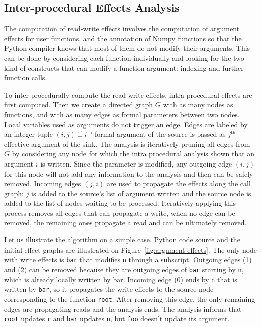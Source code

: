 \documentclass[10pt, preprint]{sigplanconf}
\begin{document}
\subsection{Inter-procedural Effects Analysis}
\label{sec:effects}

The computation of read-write effects involves the computation of argument
effects for user functions, and the annotation of Numpy functions
so that the Python compiler knows that most of them do not modify their
arguments. This can be done by considering each function individually and
looking for the two kind of constructs that can modify a function argument:
indexing and further function calls.

To inter-procedurally compute the read-write effects, intra procedural effects
are first computed. Then we create a directed graph $G$ with as many nodes as
functions, and with as many edges as formal parameters between two nodes. Local
variables used as arguments do not trigger an edge.
Edges are labeled by an integer tuple $(i, j)$ if $i^\text{th}$ formal
argument of the source is passed as $j^\text{th}$ effective argument of the
sink. The analysis is iteratively pruning all edges from $G$ by considering any
node for which the intra procedural analysis shown that an argument $i$ is
written. Since the parameter is modified, any outgoing edge $(i, j)$ for this
node will not add any information to the analysis and then can be safely
removed. Incoming edges $(j, i)$ are used to propagate the effects along the
call graph: $j$ is added to the source's list of argument written and the source
node is added to the list of nodes waiting to be processed. Iteratively
applying this process removes all edges that can propagate a write, when no edge
can be removed, the remaining ones propagate a read and can be ultimately
removed.

Let us illustrate the algorithm on a simple case. Python code source and the
initial effect graphs are illustrated on Figure~\ref{fig:argument-effects}. The
only node with write effects is \texttt{bar} that modifies \texttt{n} through a
subscript. Outgoing edges (1) and (2) can be removed because they are
outgoing edges of \texttt{bar} starting by \texttt{n}, which is already locally written by bar. Incoming edge (0) ends
by \texttt{n} that is written by \texttt{bar}, so it propagates the write
effects to the source node corresponding to the function \texttt{root}. After
removing this edge, the only remaining edges are propagating reads and the
analysis ends. The analysis informs that \texttt{root} updates \texttt{r}
and \texttt{bar} updates \texttt{n}, but \texttt{foo} doesn't update its
argument.
\end{document}
